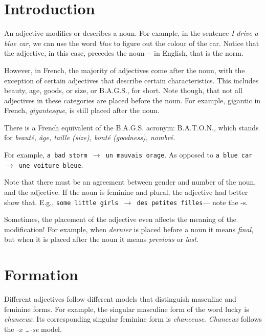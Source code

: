 \documentclass[11pt, oneside]{book}
\begin{document}
{{\section{Introduction}
An adjective modifies or describes a noun. For example, in the sentence \textit{I drive a blue car}, we can use the word \textit{blue} to figure out the colour of the car. Notice that the adjective, in this case, precedes the noun— in English, that is the norm. \vspace{0.5\baselineskip}

However, in French, the majority of adjectives come after the noun, with the exception of certain adjectives that describe certain characteristics. This includes beauty, age, goods, or size, or B.A.G.S., for short. Note though, that not all adjectives in these categories are placed before the noun. For example, gigantic in French, \textit{gigantesque}, is still placed after the noun. \vspace{0.5\baselineskip}

There is a French equivalent of the B.A.G.S. acronym: B.A.T.O.N., which stands for \textit{beaut\'e, \^age, taille (size), bont\'e (goodness), nombr\'e}. \vspace{0.5\baselineskip}

For example, \texttt{a bad storm $\rightarrow$ un mauvais orage}.
As opposed to \texttt{a blue car $\rightarrow$ une voiture bleue}. \vspace{0.5\baselineskip}

Note that there must be an agreement between gender and number of the noun, and the adjective. If the noun is feminine and plural, the adjective had better show that. E.g., \texttt{some little girls $\rightarrow$ des petites filles}— note the -s. \vspace{0.5\baselineskip}


Sometimes, the placement of the adjective even affects the meaning of the modification! For example, when \textit{dernier} is placed before a noun it means \textit{final}, but when it is placed after the noun it means \textit{previous} or \textit{last}.  \vspace{0.5\baselineskip}

\section{Formation}

Different adjectives follow different models that distinguish masculine and feminine forms. For example, the singular masculine form of the word lucky is \textit{chanceux}. Its corresponding singular feminine form is \textit{chanceuse}. \textit{Chanceux} follows the \textit{-x \ldots -se}  model. \vspace{0.5\baselineskip}

}}
\end{document}
